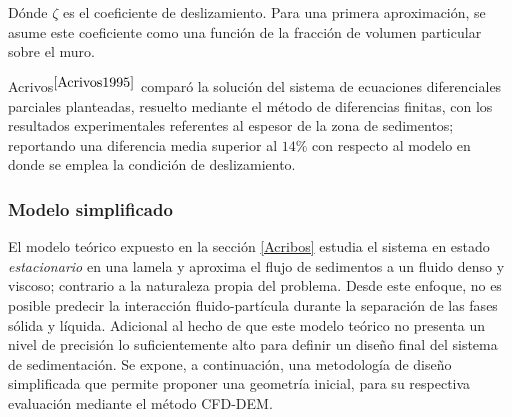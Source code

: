 \noindent
\justify

D\'onde $\zeta$ es el coeficiente de deslizamiento. Para una primera aproximaci\'on, se asume este coeficiente como una funci\'on de la fracci\'on de volumen particular sobre el muro.

\noindent
\justify

Acrivos$^{\cite{Acrivos1995}}$ compar\'o la soluci\'on del sistema de ecuaciones diferenciales parciales planteadas, resuelto mediante el m\'etodo de diferencias finitas, con los resultados experimentales referentes al espesor de la zona de sedimentos; reportando una diferencia media superior al $14 \%$ con respecto al modelo en donde se emplea la condici\'on de deslizamiento.

\subsubsection{Modelo simplificado} \label{simplificado}

\noindent
\justify

El modelo te\'orico expuesto en la secci\'on \ref{Acribos} estudia el sistema en estado \textit{estacionario} en una lamela y aproxima el flujo de sedimentos a un fluido denso y viscoso; contrario a la naturaleza propia del problema. Desde este enfoque, no es posible predecir la interacci\'on fluido-part\'icula durante la separaci\'on de las fases s\'olida y l\'iquida. Adicional al hecho de que este modelo te\'orico no presenta un nivel de precisi\'on lo suficientemente alto para definir un dise\~no final del sistema de sedimentaci\'on. Se expone, a continuaci\'on, una metodolog\'ia de dise\~no simplificada que permite proponer una geometr\'ia inicial, para su respectiva evaluaci\'on mediante el m\'etodo CFD-DEM.






